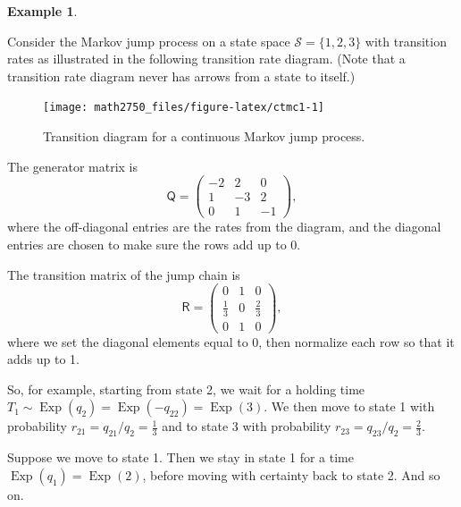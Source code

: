 \documentclass[
  a4paper,
]{article}
\theoremstyle{definition}
\theoremstyle{definition}
\newtheorem{example}{Example}[section]
\theoremstyle{definition}
\theoremstyle{remark}
\begin{document}
\begin{example}
\protect\hypertarget{exm:three-state}{}\label{exm:three-state}

Consider the Markov jump process on a state space \(\mathcal S = \{1,2,3\}\) with transition rates as illustrated in the following transition rate diagram. (Note that a transition rate diagram never has arrows from a state to itself.)

\begin{figure}

{\centering \texttt{[image: math2750\_files/figure-latex/ctmc1-1]} 

}

\caption{Transition diagram for a continuous Markov jump process.}\label{fig:ctmc1}
\end{figure}

The generator matrix is
\[ \mathsf Q = \begin{pmatrix} -2 & 2 & 0 \\
 1 & -3 & 2 \\
 0 & 1 & -1 \end{pmatrix} , \]
where the off-diagonal entries are the rates from the diagram, and the diagonal entries are chosen to make sure the rows add up to 0.

The transition matrix of the jump chain is
\[ \mathsf R = \begin{pmatrix} 0 & 1 & 0 \\
 \frac13 & 0 & \frac23 \\
 0 & 1 & 0 \end{pmatrix} , \]
where we set the diagonal elements equal to 0, then normalize each row so that it adds up to 1.

So, for example, starting from state 2, we wait for a holding time \(T_1 \sim \operatorname{Exp}(q_2) = \operatorname{Exp}(-q_{22}) = \operatorname{Exp}(3)\). We then move to state 1 with probability \(r_{21} = q_{21}/q_2 = \frac13\) and to state 3 with probability \(r_{23} = q_{23}/q_2 = \frac23\).

Suppose we move to state 1. Then we stay in state 1 for a time \(\operatorname{Exp}(q_1) = \operatorname{Exp}(2)\), before moving with certainty back to state 2. And so on.

\end{example}
\end{document}
